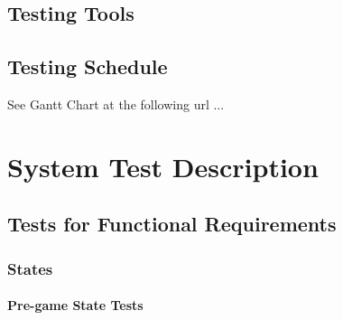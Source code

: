 \documentclass[12pt, titlepage]{article}
\begin{document}
\subsection{Testing Tools}

\subsection{Testing Schedule}

See Gantt Chart at the following url ...

\section{System Test Description}

\subsection{Tests for Functional Requirements}

\subsubsection{States}

\paragraph{Pre-game State Tests}
\end{document}
